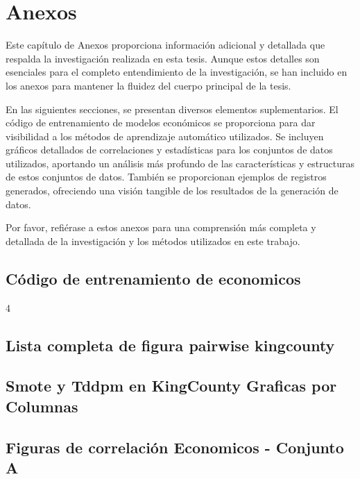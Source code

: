 \chapter{Anexos}
Este capítulo de Anexos proporciona información adicional y detallada que respalda la investigación realizada en esta tesis. Aunque estos detalles son esenciales para el completo entendimiento de la investigación, se han incluido en los anexos para mantener la fluidez del cuerpo principal de la tesis.

En las siguientes secciones, se presentan diversos elementos suplementarios. El código de entrenamiento de modelos económicos se proporciona para dar visibilidad a los métodos de aprendizaje automático utilizados. Se incluyen gráficos detallados de correlaciones y estadísticas para los conjuntos de datos utilizados, aportando un análisis más profundo de las características y estructuras de estos conjuntos de datos. También se proporcionan ejemplos de registros generados, ofreciendo una visión tangible de los resultados de la generación de datos.

Por favor, refiérase a estos anexos para una comprensión más completa y detallada de la investigación y los métodos utilizados en este trabajo.
\section{Código de entrenamiento de economicos}

4
\section{Lista completa de figura pairwise kingcounty}
\label{A-pairwise-kingcounty-top2-a-1}


\section{Smote y Tddpm en KingCounty Graficas por Columnas}



\section{Figuras de correlación Economicos - Conjunto A}
\label{pairwise-full-a}



